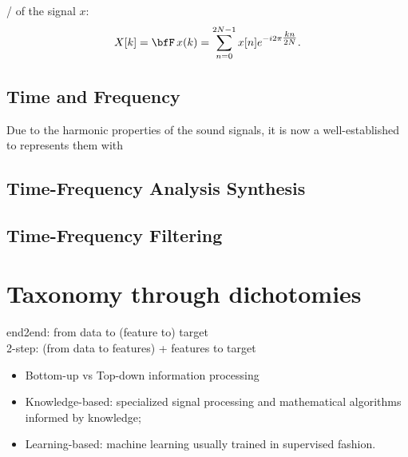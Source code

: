 \DFTdef/ of the signal $x$:
\begin{equation}
    X[k] = \discreteFT{x}(k) =
    \sum_{n = 0}^{2 N - 1}
    x[n]
    \cste^{-\csti2\pi \tfrac{kn}{2N}}.
\end{equation}

\subsection{Time and Frequency}
Due to the harmonic properties of the sound signals, it is now a well-established to represents
them with

\subsection{Time-Frequency Analysis Synthesis}


\subsection{Time-Frequency Filtering}

\section{Taxonomy through dichotomies}
end2end: from data to (feature to) target
\\2-step: (from data to features) + features to target

\begin{itemize}
    \item Bottom-up vs Top-down information processing
    \item Knowledge-based: specialized signal processing and mathematical algorithms informed by knowledge;
    \item Learning-based: machine learning usually trained in supervised fashion.
\end{itemize}

